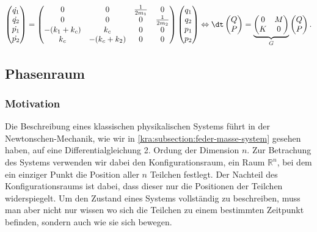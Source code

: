 \begin{equation}
    \label{kra:equation:hamilton-multispringmass}
    \begin{pmatrix}
        \dot{q_1} \\
        \dot{q_2} \\
        \dot{p_1} \\
        \dot{p_2} \\
    \end{pmatrix}
    =
    \begin{pmatrix}
        0            & 0            & \frac{1}{2m_1} & 0              \\
        0            & 0            & 0              & \frac{1}{2m_2} \\
        -(k_1 + k_c) & k_c          & 0              & 0              \\
        k_c          & -(k_c + k_2) & 0              & 0              \\
    \end{pmatrix}
    \begin{pmatrix}
        q_1 \\
        q_2 \\
        p_1 \\
        p_2 \\
    \end{pmatrix}
    \Leftrightarrow
    \dt
    \begin{pmatrix}
        Q \\
        P \\
    \end{pmatrix}
    =
    \underbrace{
        \begin{pmatrix}
            0 & M \\
            K & 0
        \end{pmatrix}
    }_{G}
    \begin{pmatrix}
        Q \\
        P \\
    \end{pmatrix}.
\end{equation}

\subsection{Phasenraum}
\subsubsection{Motivation}
Die Beschreibung eines klassischen physikalischen Systems führt in der Newtonschen-Mechanik, wie wir in \ref{kra:subsection:feder-masse-system} gesehen haben, auf eine Differentialgleichung 2. Ordung der Dimension $n$.
Zur Betrachung des Systems verwenden wir dabei den Konfigurationsraum, ein Raum $\mathbb{R}^n$, bei dem ein einziger Punkt die Position aller $n$ Teilchen festlegt.
Der Nachteil des Konfigurationsraums ist dabei, dass dieser nur die Positionen der Teilchen widerspiegelt.
Um den Zustand eines Systems vollständig zu beschreiben, muss man aber nicht nur wissen wo sich die Teilchen zu einem bestimmten Zeitpunkt befinden, sondern auch wie sie sich bewegen.

